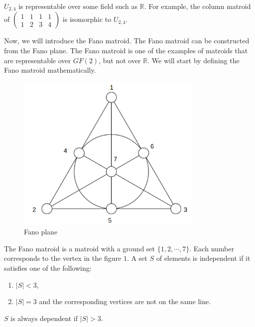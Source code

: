 \begin{rem}
$U_{2, 4}$ is representable over some field such as $\mathbb{R}$.
For example, the column matroid of $\begin{pmatrix}
1 & 1 & 1 & 1 \\
1 & 2 & 3 & 4 
\end{pmatrix}$ is isomorphic to $U_{2, 4}$.
\end{rem}


Now, we will introduce the Fano matroid.
The Fano matroid can be constructed from the Fano plane.
The Fano matroid is one of the examples of matroids that are representable over $GF(2)$, but not over $\mathbb{R}$.
We will start by defining the Fano matroid mathematically.

\begin{figure}
  \centering
    \includegraphics[width=0.8\textwidth,natwidth=610,natheight=642]{Fano_plane.png}
    \caption{Fano plane}
  \label{fig:test}
\end{figure}

\begin{defn}
The Fano matroid is a matroid with a ground set $\{ 1, 2, \cdots, 7 \}$. 
Each number corresponds to the vertex in the figure $1$.
A set $S$ of elements is independent if it satisfies one of the following:
\begin{enumerate}
\item $\lvert S \rvert < 3$,
\item $\lvert S \rvert = 3$ and the corresponding vertices are not on the same line.
\end{enumerate}
$S$ is always dependent if $\lvert S \rvert > 3$.
\end{defn}


